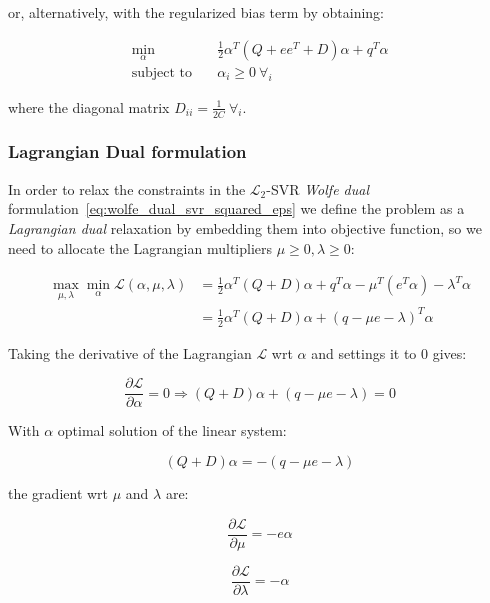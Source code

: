 or, alternatively, with the regularized bias term by obtaining:

\begin{equation} \label{eq:biased_wolfe_dual_svr_squared_eps}
    \begin{aligned}
        \min_{\alpha} \quad & \frac{1}{2}\alpha^T (Q + ee^T + D) \alpha + q^T \alpha \\
            \text{subject to} \quad & \alpha_i \geq 0 \ \forall_i
    \end{aligned}
\end{equation}

where the diagonal matrix $\displaystyle D_{ii} = \frac{1}{2C} \ \forall_i$.

\subsubsection{Lagrangian Dual formulation}

In order to relax the constraints in the $\mathcal{L}_2$-SVR \emph{Wolfe dual} formulation~\eqref{eq:wolfe_dual_svr_squared_eps} we define the problem as a \emph{Lagrangian dual} relaxation by embedding them into objective function, so we need to allocate the Lagrangian multipliers $\mu \geq 0, \lambda \geq 0$:

\begin{equation} \label{eq:l2_svr_lagrangian_dual}
	\begin{aligned}
		    \max_{\mu,\lambda} \min_{\alpha} \mathcal{L}(\alpha,\mu,\lambda) &= \frac{1}{2} \alpha^T (Q+D)\alpha+q^T\alpha - \mu^T (e^T \alpha) - \lambda^T \alpha \\
    &= \frac{1}{2} \alpha^T (Q+D)\alpha + (q - \mu e - \lambda)^T \alpha
	\end{aligned}
\end{equation}

Taking the derivative of the Lagrangian $\mathcal{L}$ wrt $\alpha$ and settings it to 0 gives:

\begin{equation} \label{eq:l2_svr_lagrangian_der_a}
	\frac{\partial \mathcal{L}}{\partial \alpha}=0\Rightarrow (Q+D) \alpha + (q - \mu e - \lambda) = 0
\end{equation}

With $\alpha$ optimal solution of the linear system:

\begin{equation} \label{eq:l2_svr_lagrangian_sol}
    (Q+D) \alpha = - (q - \mu e - \lambda)
\end{equation}

the gradient wrt $\mu$ and $\lambda$ are:

\begin{equation} \label{eq:l2_svr_lagrangian_der_mu}
	\frac{\partial \mathcal{L}}{\partial \mu}=-e \alpha
\end{equation}

\begin{equation} \label{eq:l2_svr_lagrangian_der_lalbda}
    \frac{\partial \mathcal{L}}{\partial \lambda}=-\alpha
\end{equation}
